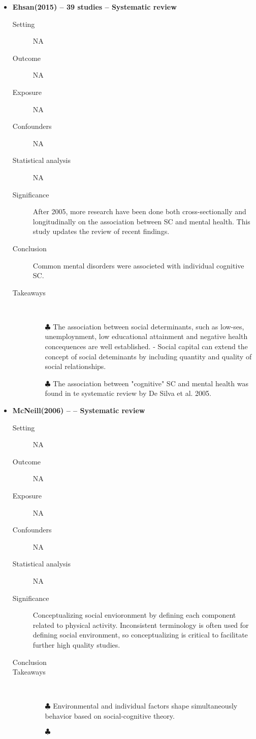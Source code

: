 \documentclass{article}
\begin{document}
\begin{itemize}
\item{\bf Ehsan(2015) -- 39 studies  -- Systematic review} 
		\begin{description}
			\item[Setting] NA 
			\item[Outcome] NA 
			\item[Exposure] NA
			\item[Confounders] NA
			\item[Statistical analysis] NA
			\item[Significance] After 2005, more research have been done both cross-sectionally and longitudinally on the association between SC and mental health. This study updates the review of recent findings. 
			\item[Conclusion] Common mental disorders were associeted with individual cognitive SC. 
			\item[Takeaways] \mbox{}\\
				\begin{itemize}
					\item[$\clubsuit$] The association between social determinants, such as low-ses, unemploynment, low educational attainment and negative health concequences are well established. - Social capital can extend the concept of social deteminants by including quantity and quality of social relationships.
					\item[$\clubsuit$] The association between "cognitive" SC and mental health was found in te systematic review by De Silva et al. 2005. 

				\end{itemize} 
		
		\end{description}

\newpage
\item{\bf McNeill(2006) --   -- Systematic review} 
		\begin{description}
			\item[Setting] NA 
			\item[Outcome] NA 
			\item[Exposure] NA
			\item[Confounders] NA
			\item[Statistical analysis] NA
			\item[Significance] Conceptualizing social envioronment by defining each component related to physical activity. Inconsistent terminology is often used for defining social environment, so conceptualizing is critical to facilitate further high quality studies.
			\item[Conclusion] 
			\item[Takeaways] \mbox{}\\
				\begin{itemize}
					\item[$\clubsuit$] Environmental and individual factors shape simultaneously behavior based on social-cognitive theory.
					\item[$\clubsuit$]

				\end{itemize} 
		\end{description}

\end{itemize}
\end{document}
